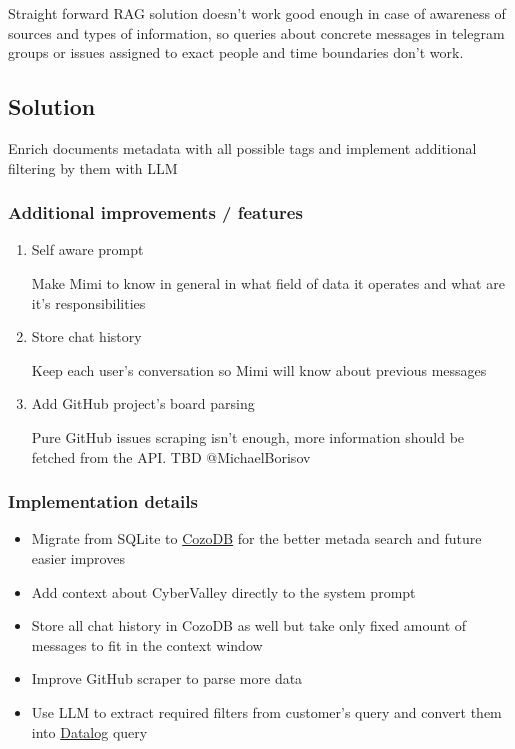 \documentclass[11pt]{article}
\begin{document}
Straight forward RAG solution doesn't work good enough in case of awareness of sources and types of information, so queries about concrete messages in telegram groups or issues assigned to exact people and time boundaries don't work.
\subsection{Solution}
\label{sec:orgca01f65}

Enrich documents metadata with all possible tags and implement additional filtering by them with LLM
\subsubsection{Additional improvements / features}
\label{sec:orga1d7574}

\begin{enumerate}
\item Self aware prompt
\label{sec:org3b8538c}

Make Mimi to know in general in what field of data it operates and what are it's responsibilities
\item Store chat history
\label{sec:org6f67b8c}

Keep each user's conversation so Mimi will know about previous messages
\item Add GitHub project's board parsing
\label{sec:org512339e}

Pure GitHub issues scraping isn't enough, more information should be fetched from the API. TBD @MichaelBorisov
\end{enumerate}
\subsubsection{Implementation details}
\label{sec:org83a6d3b}

\begin{itemize}
\item Migrate from SQLite to \href{https://docs.cozodb.org/en/latest/index.html}{CozoDB} for the better metada search and future easier improves
\item Add context about CyberValley directly to the system prompt
\item Store all chat history in CozoDB as well but take only fixed amount of messages to fit in the context window
\item Improve GitHub scraper to parse more data
\item Use LLM to extract required filters from customer's query and convert them into \href{https://en.wikipedia.org/wiki/Datalog}{Datalog} query
\end{itemize}
\end{document}
